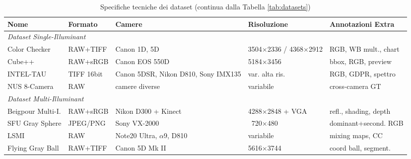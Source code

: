 \begin{table}[htbp]
\centering
\caption{Specifiche tecniche dei dataset (continua dalla Tabella \ref{tab:datasets})}
\footnotesize
\begin{tabularx}{\textwidth}{ll>{\raggedright\arraybackslash}Xl>{\raggedright\arraybackslash}X}
\toprule
\textbf{Nome} & \textbf{Formato} & \textbf{Camere} & \textbf{Risoluzione} & \textbf{Annotazioni Extra} \\
\midrule
\multicolumn{5}{l}{\textit{Dataset Single-Illuminant}} \\
\midrule
Color Checker & RAW+TIFF & Canon 1D, 5D & 3504$\times$2336 / 4368$\times$2912 & RGB, WB mult., chart \\
Cube++ & RAW+sRGB & Canon EOS 550D & 5184$\times$3456 & bbox, RGB, preview \\
INTEL-TAU & TIFF 16bit & Canon 5DSR, Nikon D810, Sony IMX135 & var. alta ris. & RGB, GDPR, spettro \\
NUS 8-Camera & RAW & 8 camere diverse & variabile & cross-camera GT \\
\midrule
\multicolumn{5}{l}{\textit{Dataset Multi-Illuminant}} \\
\midrule
Beigpour Multi-I. & RAW+sRGB & Nikon D300 + Kinect & 4288$\times$2848 + VGA & refl., shading, depth \\
SFU Gray Sphere & JPEG/PNG & Sony VX-2000 & ~720$\times$480 & dominant+second. RGB \\
LSMI & RAW & Note20 Ultra, $\alpha$9, D810 & variabile & mixing maps, CC \\
Flying Gray Ball & RAW+TIFF & Canon 5D Mk II & 5616$\times$3744 & coord ball, segment. \\
\bottomrule
\end{tabularx}
\end{table}
